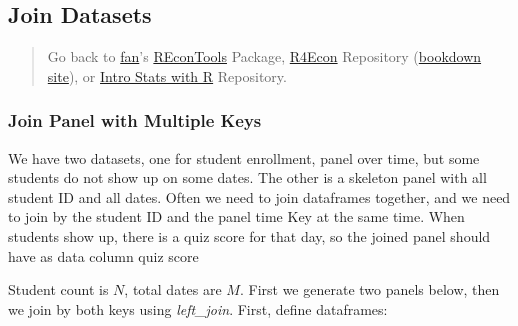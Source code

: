 \documentclass[
]{book}
\newenvironment{Shaded}{\begin{snugshade}}{\end{snugshade}}
\newcommand{\CommentTok}[1]{\textcolor[rgb]{0.56,0.35,0.01}{\textit{#1}}}
\newcommand{\DataTypeTok}[1]{\textcolor[rgb]{0.13,0.29,0.53}{#1}}
\newcommand{\DecValTok}[1]{\textcolor[rgb]{0.00,0.00,0.81}{#1}}
\newcommand{\ErrorTok}[1]{\textcolor[rgb]{0.64,0.00,0.00}{\textbf{#1}}}
\newcommand{\KeywordTok}[1]{\textcolor[rgb]{0.13,0.29,0.53}{\textbf{#1}}}
\newcommand{\NormalTok}[1]{#1}
\newcommand{\OperatorTok}[1]{\textcolor[rgb]{0.81,0.36,0.00}{\textbf{#1}}}
\newcommand{\StringTok}[1]{\textcolor[rgb]{0.31,0.60,0.02}{#1}}
\begin{document}
\hypertarget{join-datasets}{%
\subsection{Join Datasets}\label{join-datasets}}

\begin{quote}
Go back to \href{http://fanwangecon.github.io/}{fan}'s \href{https://fanwangecon.github.io/REconTools/}{REconTools} Package, \href{https://fanwangecon.github.io/R4Econ/}{R4Econ} Repository (\href{https://fanwangecon.github.io/R4Econ/bookdown}{bookdown site}), or \href{https://fanwangecon.github.io/Stat4Econ/}{Intro Stats with R} Repository.
\end{quote}

\hypertarget{join-panel-with-multiple-keys}{%
\subsubsection{Join Panel with Multiple Keys}\label{join-panel-with-multiple-keys}}

We have two datasets, one for student enrollment, panel over time, but some students do not show up on some dates. The other is a skeleton panel with all student ID and all dates. Often we need to join dataframes together, and we need to join by the student ID and the panel time Key at the same time. When students show up, there is a quiz score for that day, so the joined panel should have as data column quiz score

Student count is \(N\), total dates are \(M\). First we generate two panels below, then we join by both keys using \emph{left\_join}. First, define dataframes:

\begin{Shaded}
\end{Shaded}
\end{document}

